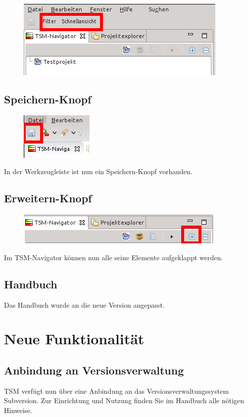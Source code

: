 \documentclass[11pt,a4paper,titlepage]{article}
\begin{document}
\begin{figure}[H]
 \centering
 \includegraphics{./BilderAenderungen/filter-schnellansicht-neu.png}
\end{figure}


\subsection{Speichern-Knopf}
\begin{figure}[H]
 \centering
 \includegraphics[scale=1.5]{./BilderAenderungen/speichern-knopf.png}
\end{figure}
In der Werkzeugleiste ist nun ein Speichern-Knopf vorhanden.

\subsection{Erweitern-Knopf}
\begin{figure}[H]
 \centering
 \includegraphics[width=\textwidth]{./BilderAenderungen/erweitern-knopf.png}
\end{figure}
Im TSM-Navigator können nun alle seine Elemente aufgeklappt werden.


\subsection{Handbuch}
Das Handbuch wurde an die neue Version angepasst.

\section{Neue Funktionalität}
\subsection{Anbindung an Versionsverwaltung}
TSM verfügt nun über eine Anbindung an das Versionsverwaltungssystem Subversion.
Zur Einrichtung und Nutzung finden Sie im Handbuch alle nötigen Hinweise.

 
\end{document}
